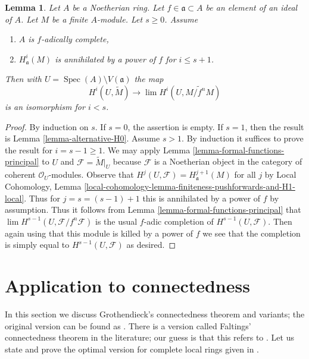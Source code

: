 \documentclass{stacks-project}
\theoremstyle{plain}
\newtheorem{lemma}[subsection]{Lemma}
\theoremstyle{definition}
\theoremstyle{remark}
\numberwithin{equation}{subsection}
\def\lim{\mathop{\mathrm{lim}}\nolimits}
\def\Spec{\mathop{\mathrm{Spec}}}
\begin{document}
\begin{lemma}
\label{lemma-alternative-higher}
Let $A$ be a Noetherian ring. Let $f \in \mathfrak a \subset A$
be an element of an ideal of $A$. Let $M$ be a finite $A$-module.
Let $s \geq 0$. Assume
\begin{enumerate}
\item $A$ is $f$-adically complete,
\item $H^i_\mathfrak a(M)$ is annihilated by a power of $f$
for $i \leq s + 1$.
\end{enumerate}
Then with $U = \Spec(A) \setminus V(\mathfrak a)$ the map
$$
H^i(U, \widetilde{M})
\longrightarrow
\lim H^i(U, \widetilde{M/f^nM})
$$
is an isomorphism for $i < s$.
\end{lemma}

\begin{proof}
By induction on $s$. If $s = 0$, the assertion is empty. If $s = 1$, then
the result is Lemma \ref{lemma-alternative-H0}. Assume $s > 1$. By induction
it suffices to prove the result for $i = s - 1 \geq 1$.
We may apply Lemma \ref{lemma-formal-functions-principal}
to $U$ and $\mathcal{F} = \widetilde{M}|_U$
because $\mathcal{F}$ is a Noetherian object in
the category of coherent $\mathcal{O}_U$-modules.
Observe that $H^j(U, \mathcal{F}) = H^{j + 1}_\mathfrak a(M)$ for all $j$ by
Local Cohomology, Lemma
\ref{local-cohomology-lemma-finiteness-pushforwards-and-H1-local}.
Thus for $j = s = (s - 1) + 1$ this is
annihilated by a power of $f$ by assumption.
Thus it follows from
Lemma \ref{lemma-formal-functions-principal} that
$\lim H^{s - 1}(U, \mathcal{F}/f^n\mathcal{F})$
is the usual $f$-adic completion of $H^{s - 1}(U, \mathcal{F})$.
Then again using that this module is killed by a power of
$f$ we see that the completion is simply equal to $H^{s - 1}(U, \mathcal{F})$
as desired.
\end{proof}





\section{Application to connectedness}
\label{section-connected}

\noindent
In this section we discuss Grothendieck's connectedness theorem
and variants; the original version can be found as
\cite[Exposee XIII, Theorem 2.1]{SGA2}. There is a version
called Faltings' connectedness theorem in the literature;
our guess is that this refers to \cite[Theorem 6]{Faltings-some}.
Let us state and prove the optimal version for complete
local rings given in \cite[Theorem 1.6]{Varbaro}.
\end{document}
